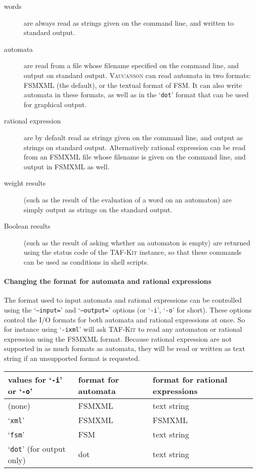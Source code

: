 \documentclass[a4paper]{report}
\newcommand\samp[1]{`\texttt{#1}'}
\newcommand{\tafkit}{\textsc{TAF-Kit}\xspace}
\newcommand{\Vauc}{\textsc{Vaucanson}\xspace}
\begin{document}
\begin{description}
\item[words] are always read as strings given on the command line, and
  written to standard output.
\item[automata] are read from a file whose filename specified on the
  command line, and output on standard output.  \Vauc can read
  automata in two formats: FSMXML (the default), or the textual format
  of FSM.  It can also write automata in these formats, as well as in the
  \samp{dot} format that can be used for graphical output.
\item[rational expression] are by default read as strings given on the
  command line, and output as strings on standard output.
  Alternatively rational expression can be read from an FSMXML file whose
  filename is given on the command line, and output in FSMXML as well.
\item[weight results] (such as the result of the evaluation of a word on
  an automaton) are simply output as strings on the standard output.
\item[Boolean results] (such as the result of asking whether an automaton
  is empty) are returned using the status code of the
  \tafkit instance, so that these commands can be used as conditions
  in shell scripts.
\end{description}

\paragraph{Changing the format for automata and rational expressions}

The format used to input automata and rational expressions can be
controlled using the \samp{--input=} and \samp{--output=} options (or
\samp{-i}, \samp{-o} for short).  These options control the I/O
formats for both automata and rational expressions at once.  So for
instance using \samp{-ixml} will ask \tafkit to read any automaton or
rational expression using the FSMXML format.  Because rational
expression are not supported in as much formats as automata, they will
be read or written as text string if an unsupported format is
requested.

\begin{center}
\begin{tabular}{lll}
  values for \samp{-i} or \samp{-o}    & format for automata & format for rational expressions \\
  \hline
  (none)     & FSMXML              & text string \\
  \samp{xml} & FSMXML              & FSMXML \\
  \samp{fsm} & FSM                 & text string \\
  \samp{dot} (for output only) & dot   & text string \\
  \hline
\end{tabular}
\end{center}
\end{document}
